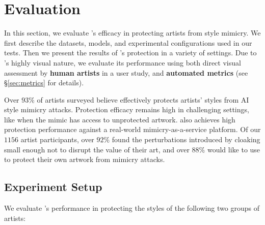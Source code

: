 \section{Evaluation}
\label{sec:eval-cloak}

In this section, we evaluate \system's efficacy in protecting artists from
style mimicry. We first describe the datasets, models, and experimental
configurations used in our tests. Then we present the results of \system's
protection in a variety of settings. Due to \system's highly visual nature,
we evaluate its performance using both direct visual assessment by
\textbf{human artists} in a user study, and \textbf{automated metrics} (see
\S\ref{sec:metrics} for details).

 Over $93\%$ of artists surveyed believe \system{}
effectively protects artists' styles from AI style mimicry
attacks. Protection efficacy remains high in challenging settings, like when
the mimic has access to unprotected artwork. \system{} also achieves high
protection performance against a real-world mimicry-as-a-service platform. Of
our $1156$ artist participants, over $92\%$ found the perturbations
introduced by cloaking small enough not to disrupt the value of their art,
and over $88\%$ would like to use \system{} to protect their own artwork from
mimicry attacks.

\secspace
\subsection{Experiment Setup}
\label{sec:cloak-setup}

 We evaluate \system's performance in protecting the styles of the following two groups of artists: 

